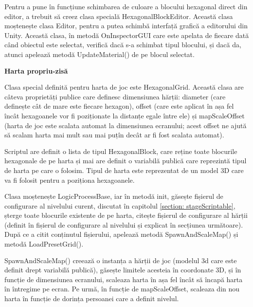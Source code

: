 \documentclass[12pt, a4paper]{article}
\begin{document}
	Pentru a pune în funcțiune schimbarea de culoare a blocului hexagonal direct din editor, a trebuit să creez clasa specială HexagonalBlockEditor. Această clasa moștenește clasa Editor, pentru a putea schimbă interfață grafică a editorului din Unity. Această clasa, în metodă OnInspectorGUI care este apelata de fiecare dată când obiectul este selectat, verifică dacă s-a schimbat tipul blocului, și dacă da, atunci apelează metodă UpdateMaterial() de pe blocul selectat.
	\newline
	
	
	
	
	
	\textbf{Harta propriu-zisă}
	
	Clasa special definită pentru harta de joc este HexagonalGrid. Această clasa are câteva proprietăți publice care definesc dimensiunea hărții: diameter (care definește cât de mare este fiecare hexagon), offset (care este aplicat în așa fel încât hexagoanele vor fi poziționate la distanțe egale între ele) și mapScaleOffset (harta de joc este scalata automat la dimensiunea ecranului; acest offset ne ajută să scalam harta mai mult sau mai puțîn decât ar fi fost scalata automat).
	\newline
	
	Scriptul are definit o lista de tipul HexagonalBlock, care reține toate blocurile hexagonale de pe harta și mai are definit o variabilă publică care reprezintă tipul de harta pe care o folosim. Tipul de harta este reprezentat de un model 3D care va fi folosit pentru a poziționa hexagoanele.
	\newline
	
	Clasa moștenește LogicProcessBase, iar în metodă init, găsește fișierul de configurare al nivelului curent, discutat în capitolul \ref{section: stageScriptable}, șterge toate blocurile existente de pe harta, citește fișierul de configurare al hărții (definit în fișierul de configurare al nivelului și explicat în secțiunea următoare). După ce a citit conținutul fișierului, apelează metodă SpawnAndScaleMap() și metodă LoadPresetGrid().
	\newline
	
	SpawnAndScaleMap() creează o instanța a hărții de joc (modelul 3d care este definit drept variabilă publică), găsește limitele acesteia în coordonate 3D, și în funcție de dimensiunea ecranului, scaleaza harta în așa fel încât să încapă harta în întregime pe ecran. Pe urmă, în funcție de mapScaleOffset, scaleaza din nou harta în funcție de dorința persoanei care a definit nivelul.
	\newline
	
\end{document}
